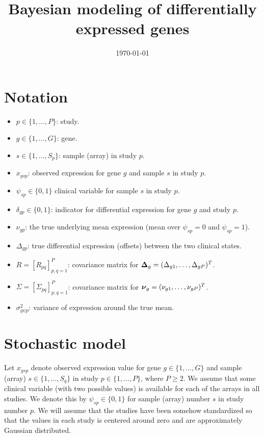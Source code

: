 \documentclass[11pt]{article}
\newcommand{\bDelta}{\mbox{\boldmath $\Delta$}}
\newcommand{\bnu}{\mbox{\boldmath $\nu$}}
\begin{document}

\title{Bayesian modeling of differentially expressed genes}



\date{\today}



\maketitle


%

\section{\label{Sec:Notation}Notation}
\begin{itemize}
\item[] $p\in \{ 1,\ldots,P\}$: study.
\item[] $g\in \{ 1,\ldots,G\}$: gene.
\item[] $s\in \{ 1,\ldots,S_p\}$: sample (array) in study $p$.
\item[] $x_{gsp}$: observed expression for gene $g$ and sample $s$ in study $p$.
\item[] $\psi_{sp}\in \{ 0,1\}$ clinical variable for sample $s$ in study $p$.
\item[] $\delta_{gp}\in\{ 0,1\}$: indicator for differential expression for gene $g$ and study $p$.
\item[] $\nu_{gp}$: the true underlying mean expression 
(mean over $\psi_{sp} = 0$ and $\psi_{sp} = 1$).
\item[] $\Delta_{gp}$: true differential expression (offsets) between the two clinical states.
\item[] $R = [R_{pq}]_{p,q=1}^P$: covariance matrix for $\bDelta_g = (\Delta_{g1},\ldots,
\Delta_{gP})^T$.
\item[] $\Sigma = [\Sigma_{pq}]_{p,q=1}^P$: covariance matrix for $\bnu_g = (\nu_{g1},\ldots,\nu_{gP})^T$.
\item[] $\sigma^2_{g\psi p}$: variance of expression around the true mean.
\end{itemize}




\section{\label{Sec:Model}Stochastic model}
Let $x_{gsp}$ denote observed expression value for gene 
$g\in \{ 1,\ldots,G\}$ and sample (array) $s\in \{ 1,\ldots,S_q\}$ in 
study $p \in \{ 1,\ldots,P\}$, where $P\geq 2$. We
assume that some clinical variable (with two possible values) 
is available for each of the arrays in all studies. We denote 
this by $\psi_{sp}\in\{ 0,1\}$ for sample (array) number $s$ in study 
number $p$. We will assume that the studies have been somehow
standardized so that the values in each study is centered around
zero and are approximately Gaussian distributed.
\end{document}
